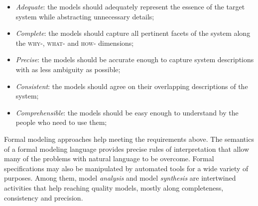 \begin{itemize}
\item \emph{Adequate}: the models should adequately represent the essence of the target system while abstracting unnecessary details;
\item \emph{Complete}: the models should capture all pertinent facets of the system along the \textsc{why-}, \textsc{what-} and \textsc{how-} dimensions;
\item \emph{Precise}: the models should be accurate enough to capture system descriptions with as less ambiguity as possible;
\item \emph{Consistent}: the models should agree on their overlapping descriptions of the system;
\item \emph{Comprehensible}: the models should be easy enough to understand by the people who need to use them;
\end{itemize}

Formal modeling approaches help meeting the requirements above. The semantics of a formal modeling language provides precise rules of interpretation that allow many of the problems with natural language to be overcome. Formal specifications may also be manipulated by automated tools for a wide variety of purposes. Among them, model \emph{analysis} and model \emph{synthesis} are intertwined activities that help reaching quality models, mostly along completeness, consistency  and precision.

